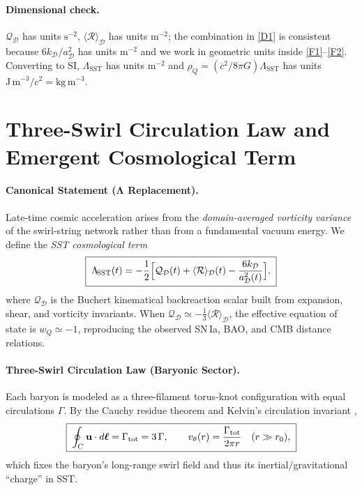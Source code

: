 \documentclass[10pt,reprint,aps,onecolumn,nofootinbib]{revtex4-2}
\begin{document}
\paragraph{Dimensional check.}
    $\mathcal{Q}_\mathcal{D}$ has units $\mathrm{s^{-2}}$, $\langle \mathcal{R}\rangle_\mathcal{D}$ has units $\mathrm{m^{-2}}$; the combination in \eqref{D1} is consistent because $6k_\mathcal{D}/a_\mathcal{D}^2$ has units $\mathrm{m^{-2}}$ and we work in geometric units inside \eqref{F1}–\eqref{F2}. Converting to SI, $\Lambda_{\!\mathrm{SST}}$ has units $\mathrm{m^{-2}}$ and $\rho_Q=(c^{2}/8\pi G)\Lambda_{\!\mathrm{SST}}$ has units $\mathrm{J\,m^{-3}}/c^{2}=\mathrm{kg\,m^{-3}}$.


\section{Three-Swirl Circulation Law and Emergent Cosmological Term}
\label{sec:SST-three-swirl-Lambda}

\paragraph{Canonical Statement (Λ Replacement).}
    Late-time cosmic acceleration arises from the \emph{domain-averaged vorticity variance}
    of the swirl-string network rather than from a fundamental vacuum energy. We define
    the \emph{SST cosmological term}
    \begin{equation}
        \boxed{\;
        \Lambda_{\!\mathrm{SST}}(t)=
            -\frac{1}{2}\Bigl[\mathcal{Q}_\mathcal{D}(t)+\langle\mathcal{R}\rangle_\mathcal{D}(t)
            -\frac{6k_\mathcal{D}}{a_\mathcal{D}^{2}(t)}\Bigr],
            \;}
        \label{eq:SST-Lambda}
    \end{equation}
    where $\mathcal{Q}_\mathcal{D}$ is the Buchert kinematical backreaction scalar
    \cite{Buchert2000,Buchert2001} built from expansion, shear, and vorticity invariants.
    When $\mathcal{Q}_\mathcal{D}\simeq -\tfrac13\langle\mathcal{R}\rangle_\mathcal{D}$,
    the effective equation of state is $w_Q\simeq-1$, reproducing the observed SN\,Ia,
    BAO, and CMB distance relations.

\paragraph{Three-Swirl Circulation Law (Baryonic Sector).}
    Each baryon is modeled as a three-filament torus-knot configuration with
    equal circulations $\Gamma$. By the Cauchy residue theorem and Kelvin’s circulation
    invariant \cite{Kelvin1869,Batchelor1967,Saffman1992},
    \begin{equation}
        \boxed{\;
        \oint_{C} \mathbf{u}\cdot d\boldsymbol{\ell} =
            \Gamma_{\rm tot} = 3\,\Gamma,
            \qquad
            v_\theta(r)=\frac{\Gamma_{\rm tot}}{2\pi r}\quad(r\gg r_0),
            \;}
        \label{eq:three-swirl-circulation}
    \end{equation}
    which fixes the baryon’s long-range swirl field and thus its inertial/gravitational
    ``charge'' in SST.
\end{document}
